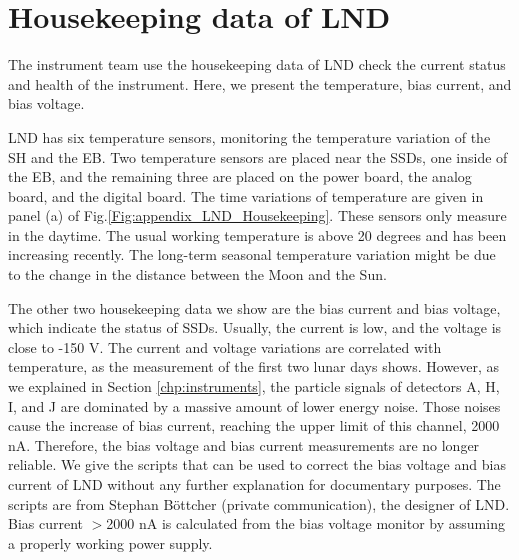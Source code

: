 \section*{Housekeeping data of LND}

The instrument team use the housekeeping data of \ac{LND} check the current status and health of the instrument. Here, we present the temperature, bias current, and bias voltage.


\ac{LND} has six temperature sensors, monitoring the temperature variation of the \ac{SH} and the \ac{EB}. Two temperature sensors are placed near the \acp{SSD}, one inside of the \ac{EB}, and the remaining three are placed on the power board, the analog board, and the digital board. The time variations of temperature are given in panel (a) of Fig.\ref{Fig:appendix_LND_Housekeeping}. These sensors only measure in the daytime. The usual working temperature is above 20 degrees and has been increasing recently. The long-term seasonal temperature variation might be due to the change in the distance between the Moon and the Sun.

The other two housekeeping data we show are the bias current and bias voltage, which indicate the status of \acp{SSD}. Usually, the current is low, and the voltage is close to -150 V. The current and voltage variations are correlated with temperature, as the measurement of the first two lunar days shows.
However, as we explained in Section \ref{chp:instruments}, the particle signals of detectors A, H, I, and J are dominated by a massive amount of lower energy noise. Those noises cause the increase of bias current, reaching the upper limit of this channel, 2000 nA. Therefore, the bias voltage and bias current measurements are no longer reliable. We give the scripts that can be used to correct the bias voltage and bias current of \ac{LND} without any further explanation for documentary purposes. The scripts are from Stephan B\"{o}ttcher (private communication), the designer of \ac{LND}. Bias current $>$2000 nA is calculated from the bias voltage monitor by assuming a properly working power supply.



